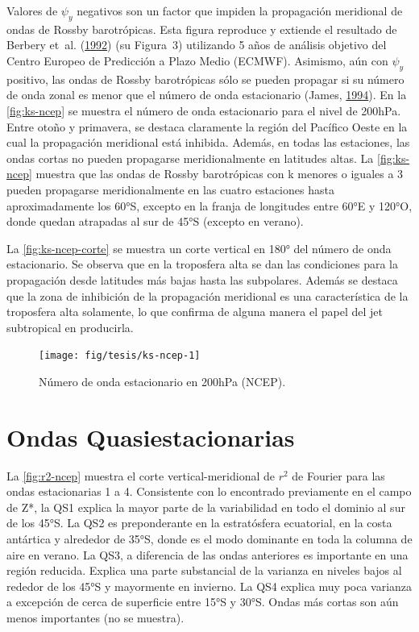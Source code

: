 \documentclass[spanish,a4paper,12pt,oneside]{book}
\begin{document}
Valores de \(\psi_y\) negativos son un factor que impiden la propagación
meridional de ondas de Rossby barotrópicas. Esta figura reproduce y
extiende el resultado de Berbery et~al.
(\protect\hyperlink{ref-Berbery1992}{1992}) (su Figura~3) utilizando 5
años de análisis objetivo del Centro Europeo de Predicción a Plazo Medio
(ECMWF). Asimismo, aún con \(\psi_y\) positivo, las ondas de Rossby
barotrópicas sólo se pueden propagar si su número de onda zonal es menor
que el número de onda estacionario (James,
\protect\hyperlink{ref-James}{1994}). En la \autoref{fig:ks-ncep} se
muestra el número de onda estacionario para el nivel de 200hPa. Entre
otoño y primavera, se destaca claramente la región del Pacífico Oeste en
la cual la propagación meridional está inhibida. Además, en todas las
estaciones, las ondas cortas no pueden propagarse meridionalmente en
latitudes altas. La \autoref{fig:ks-ncep} muestra que las ondas de
Rossby barotrópicas con k menores o iguales a 3 pueden propagarse
meridionalmente en las cuatro estaciones hasta aproximadamente los 60°S,
excepto en la franja de longitudes entre 60°E y 120°O, donde quedan
atrapadas al sur de 45°S (excepto en verano).

La \autoref{fig:ks-ncep-corte} se muestra un corte vertical en 180° del
número de onda estacionario. Se observa que en la troposfera alta se dan
las condiciones para la propagación desde latitudes más bajas hasta las
subpolares. Además se destaca que la zona de inhibición de la
propagación meridional es una característica de la troposfera alta
solamente, lo que confirma de alguna manera el papel del jet subtropical
en producirla.

\begin{landscape}\begin{figure}

{\centering \texttt{[image: fig/tesis/ks-ncep-1]} 

}

\caption{Número de onda estacionario en 200hPa (NCEP).}\label{fig:ks-ncep}
\end{figure}
\end{landscape}

\section{Ondas Quasiestacionarias}\label{ondas-quasiestacionarias}

La \autoref{fig:r2-ncep} muestra el corte vertical-meridional de \(r^2\)
de Fourier para las ondas estacionarias 1 a 4. Consistente con lo
encontrado previamente en el campo de Z*, la QS1 explica la mayor parte
de la variabilidad en todo el dominio al sur de los 45°S. La QS2 es
preponderante en la estratósfera ecuatorial, en la costa antártica y
alrededor de 35°S, donde es el modo dominante en toda la columna de aire
en verano. La QS3, a diferencia de las ondas anteriores es importante en
una región reducida. Explica una parte substancial de la varianza en
niveles bajos al rededor de los 45°S y mayormente en invierno. La QS4
explica muy poca varianza a excepción de cerca de superficie entre 15°S
y 30°S. Ondas más cortas son aún menos importantes (no se muestra).
\end{document}
